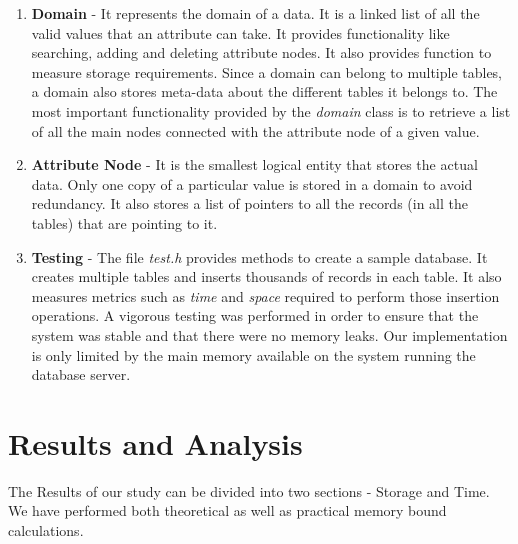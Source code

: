 \documentclass[12pt, oneside]{book}
\begin{document}
\begin{enumerate}
 \item \textbf{Domain} - It represents the domain of a data. It is a linked list of all the valid values that an attribute can take. It provides functionality like searching, adding and deleting attribute nodes. It also provides function to measure storage requirements. Since a domain can belong to multiple tables, a domain also stores meta-data about the different tables it belongs to. The most important functionality provided by the \emph{domain} class is to retrieve a list of all the main nodes connected with the attribute node of a given value.
 \item \textbf{Attribute Node} - It is the smallest logical entity that stores the actual data. Only one copy of a particular value is stored in a domain to avoid redundancy. It also stores a list of pointers to all the records (in all the tables) that are pointing to it.
 \item \textbf{Testing} - The file \emph{test.h} provides methods to create a sample database. It creates multiple tables and inserts thousands of records in each table. It also measures metrics such as \emph{time} and \emph{space} required to perform those insertion operations. A vigorous testing was performed in order to ensure that the system was stable and that there were no memory leaks. Our implementation is only limited by the main memory available on the system running the database server.
\end{enumerate}

\section{Results and Analysis}
The Results of our study can be divided into two sections - Storage and Time. We have performed both theoretical as well as practical memory bound calculations. \\
\end{document}
